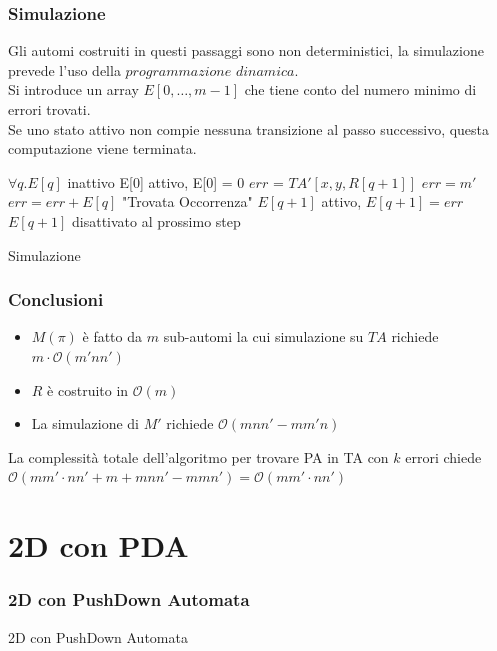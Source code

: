 \documentclass{beamer}
\newcommand{\bigO}{\ensuremath{\mathcal{O}}} %
\begin{document}
\begin{frame}
\frametitle{Simulazione}
Gli automi costruiti in questi passaggi sono non deterministici, la simulazione prevede l'uso della $programmazione$ $dinamica$.\\
Si introduce un array $E[0,\dots, m-1]$ che tiene conto del numero minimo di errori trovati.\\
Se uno stato attivo non compie nessuna transizione al passo successivo, questa computazione viene terminata.
\end{frame}


\begin{frame}

\begin{algorithm}[H]
\begin{algorithmic}[1]
  \scriptsize
{}
\STATE $\forall q . E[q]$ inattivo
		\STATE E[0] attivo, E[0] = 0
			\STATE $err$ = $TA'[x,y,R[q+1]]$
			 \STATE $err = m'$ \ENDIF
			\STATE $err = err + E[q]$
				 \STATE "Trovata Occorrenza"
				\ELSE \STATE $E[q+1]$ attivo, $E[q+1] = err$
				\ENDIF
			\ELSE \STATE $E[q+1]$ disattivato al prossimo step
			\ENDIF
		\ENDFOR
	\ENDFOR
\ENDFOR


\end{algorithmic}
\caption{Simulazione}
\end{algorithm}

\end{frame}

\begin{frame}
\frametitle{Conclusioni}

\begin{itemize}
\item $M(\pi)$ è fatto da $m$ sub-automi la cui simulazione su $TA$ richiede $m \cdot \bigO{(m'nn')}$
\item $R$ è costruito in $\bigO{(m)}$ 
\item La simulazione di $M'$ richiede $\bigO{(mnn' - mm'n)}$
\end{itemize}
La complessità totale dell'algoritmo per trovare PA in TA con $k$ errori chiede $\bigO{(mm' \cdot nn' + m +mnn' - mmn')} = \bigO{(mm' \cdot nn')}$

\end{frame}

\section{2D con PDA}
\begin{frame}
\frametitle{2D con PushDown Automata}
\Huge{\centerline{2D con PushDown Automata}}
\end{frame}
\end{document}
